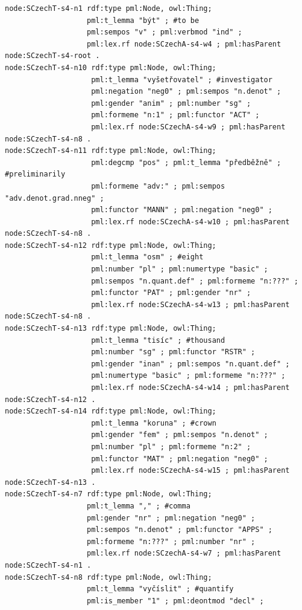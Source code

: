 \begin{listing}[ht]
\begin{verbatim}
node:SCzechT-s4-n1 rdf:type pml:Node, owl:Thing;
                   pml:t_lemma "být" ; #to be
                   pml:sempos "v" ; pml:verbmod "ind" ; 
                   pml:lex.rf node:SCzechA-s4-w4 ; pml:hasParent node:SCzechT-s4-root .
node:SCzechT-s4-n10 rdf:type pml:Node, owl:Thing;
                    pml:t_lemma "vyšetřovatel" ; #investigator
                    pml:negation "neg0" ; pml:sempos "n.denot" ;
                    pml:gender "anim" ; pml:number "sg" ;
                    pml:formeme "n:1" ; pml:functor "ACT" ;
                    pml:lex.rf node:SCzechA-s4-w9 ; pml:hasParent node:SCzechT-s4-n8 .
node:SCzechT-s4-n11 rdf:type pml:Node, owl:Thing;
                    pml:degcmp "pos" ; pml:t_lemma "předběžně" ; #preliminarily
                    pml:formeme "adv:" ; pml:sempos "adv.denot.grad.nneg" ;
                    pml:functor "MANN" ; pml:negation "neg0" ;
                    pml:lex.rf node:SCzechA-s4-w10 ; pml:hasParent node:SCzechT-s4-n8 .
node:SCzechT-s4-n12 rdf:type pml:Node, owl:Thing;
                    pml:t_lemma "osm" ; #eight
                    pml:number "pl" ; pml:numertype "basic" ;
                    pml:sempos "n.quant.def" ; pml:formeme "n:???" ;
                    pml:functor "PAT" ; pml:gender "nr" ;
                    pml:lex.rf node:SCzechA-s4-w13 ; pml:hasParent node:SCzechT-s4-n8 .
node:SCzechT-s4-n13 rdf:type pml:Node, owl:Thing;
                    pml:t_lemma "tisíc" ; #thousand
                    pml:number "sg" ; pml:functor "RSTR" ;
                    pml:gender "inan" ; pml:sempos "n.quant.def" ;
                    pml:numertype "basic" ; pml:formeme "n:???" ;
                    pml:lex.rf node:SCzechA-s4-w14 ; pml:hasParent node:SCzechT-s4-n12 .
node:SCzechT-s4-n14 rdf:type pml:Node, owl:Thing;
                    pml:t_lemma "koruna" ; #crown
                    pml:gender "fem" ; pml:sempos "n.denot" ;
                    pml:number "pl" ; pml:formeme "n:2" ;
                    pml:functor "MAT" ; pml:negation "neg0" ;
                    pml:lex.rf node:SCzechA-s4-w15 ; pml:hasParent node:SCzechT-s4-n13 .
node:SCzechT-s4-n7 rdf:type pml:Node, owl:Thing;
                   pml:t_lemma "," ; #comma
                   pml:gender "nr" ; pml:negation "neg0" ;
                   pml:sempos "n.denot" ; pml:functor "APPS" ;
                   pml:formeme "n:???" ; pml:number "nr" ;
                   pml:lex.rf node:SCzechA-s4-w7 ; pml:hasParent node:SCzechT-s4-n1 .
node:SCzechT-s4-n8 rdf:type pml:Node, owl:Thing;
                   pml:t_lemma "vyčíslit" ; #quantify
                   pml:is_member "1" ; pml:deontmod "decl" ;

\end{verbatim}
\end{listing}
